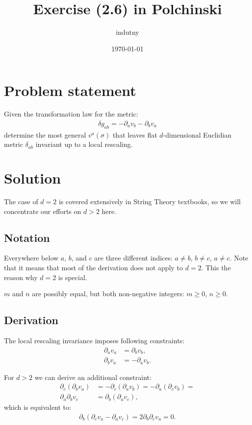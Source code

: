 \documentclass[aps,prd,final,twocolumn,floats,floatfix,nofootinbib,10pt]{revtex4-1}
\begin{document}
\title{Exercise (2.6) in Polchinski}
\author{indutny}
\date{\today}
\noaffiliation

\maketitle

\section{Problem statement}

Given the transformation law for the metric:
\begin{align}
  \delta g_{ab} = -\partial_a v_b - \partial_b v_a
\end{align}
determine the most general $v^a(\sigma)$ that leaves flat $d$-dimensional
Euclidian metric $\delta_{ab}$ invariant up to a local rescaling.

\section{Solution}

The case of $d = 2$ is covered extensively in String Theory textbooks, so we
will concentrate our efforts on $d > 2$ here.

\subsection{Notation}

Everywhere below $a$, $b$, and $c$ are three different indices:
$a \neq b$, $b \neq c$, $a \neq c$. Note that it means that most of the
derivation does not apply to $d = 2$. This the reason why $d = 2$ is special.

$m$ and $n$ are possibly equal, but both non-negative integers: $m \geq 0$,
$n \geq 0$.

\subsection{Derivation}

The local rescaling invariance imposes following constraints:
\begin{align}
  \partial_a v_a & = \partial_b v_b, \label{eq:diagonal} \\
  \partial_b v_a & = -\partial_a v_b \label{eq:off-diagonal}.
\end{align}

For $d > 2$ we can derive an additional constraint:
\begin{align}
  \partial_c \left( \partial_b v_a \right) & =
  -\partial_c \left( \partial_a v_b \right) =
  -\partial_a \left( \partial_c v_b \right) = \\
  \partial_a \partial_b v_c & = \partial_b \left( \partial_a v_c \right),
\end{align}
which is equivalent to:
\begin{align} \label{eq:two-vars}
  \partial_b \left( \partial_c v_a - \partial_a v_c \right) =
  2 \partial_b \partial_c v_a = 0.
\end{align}
\end{document}
